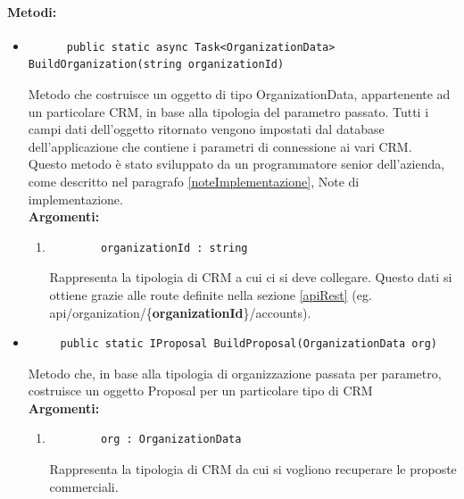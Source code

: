 \paragraph{Metodi:}\hfill
\begin{itemize}
	\itemsep0em 
	\item 
	\begin{lstlisting}
	  public static async Task<OrganizationData> BuildOrganization(string organizationId)	
	\end{lstlisting}
	Metodo che costruisce un oggetto di tipo OrganizationData, appartenente ad un particolare \gls{CRM}, in base alla tipologia del parametro passato.
	Tutti i campi dati dell'oggetto ritornato vengono impostati dal database dell'applicazione che contiene i parametri di connessione ai vari \gls{CRM}.\\
	Questo metodo è stato sviluppato da un programmatore senior dell'azienda, come descritto nel paragrafo \ref{noteImplementazione}, Note di implementazione.\\
	\textbf{\small Argomenti:}
	\begin{enumerate}[leftmargin=*]
		\itemsep0em 
		\item 
		\begin{lstlisting}
		organizationId : string
		\end{lstlisting}
		Rappresenta la tipologia di \gls{CRM} a cui ci si deve collegare. Questo dati si ottiene grazie alle route definite nella sezione \ref{apiRest} (eg. api/organization/\{\textbf{organizationId}\}/accounts).
	\end{enumerate}
	
	\item 
	\begin{lstlisting}
     public static IProposal BuildProposal(OrganizationData org)
	\end{lstlisting}
	Metodo che, in base alla tipologia di organizzazione passata per parametro, costruisce un oggetto Proposal per un particolare tipo di \gls{CRM}\\
	\textbf{\small Argomenti:}
	\begin{enumerate}[leftmargin=*]
		\itemsep0em
		\item 
		\begin{lstlisting}
		org : OrganizationData
		\end{lstlisting}
		Rappresenta la tipologia di \gls{CRM} da cui si vogliono recuperare le proposte commerciali.
	\end{enumerate}
\end{itemize}
 
